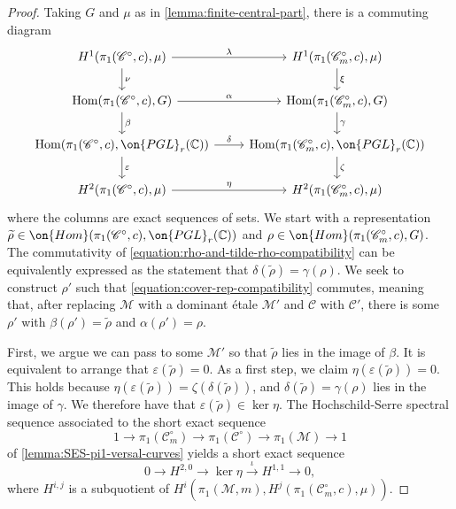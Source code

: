 \documentclass[12 pt]{amsart}
\theoremstyle{plain}
\theoremstyle{definition}
\theoremstyle{remark}
\numberwithin{equation}{section}
\DeclareMathOperator\Hom{Hom}
\begin{document}
\begin{proof}
	Taking $G$ and $\mu$ as in \autoref{lemma:finite-central-part},
	there is a commuting diagram
\begin{equation}
	\label{equation:pgl-and-birman}
	\begin{tikzcd} 
H^1(\pi_1(\mathscr C^\circ,c), \mu) \ar
		{r}{\lambda} \ar
		{d}{\nu} &  H^1(\pi_1(\mathscr
				C_m^\circ,c),
		\mu) \ar {d}{\xi} \\
		\Hom(\pi_1(\mathscr C^\circ,c), G) \ar
		{r}{\alpha} \ar
		{d}{\beta} & \Hom(\pi_1(\mathscr
				C_m^\circ,c),
			G) \ar {d}{\gamma} \\
		\Hom(\pi_1(\mathscr C^\circ,c), \on{PGL}_r(\mathbb C)) \ar
		{r}{\delta}\ar{d}{\varepsilon}
		&\Hom(\pi_1(\mathscr C_m^\circ,c),
		\on{PGL}_r(\mathbb C))\ar{d}{\zeta} \\
			H^2(\pi_1(\mathscr C^\circ,c), \mu) \ar {r}{\eta}
		& H^2(\pi_1(\mathscr C_m^\circ,c),
		\mu)
\end{tikzcd}\end{equation}
where the columns are exact sequences of sets.
We start with a representation $\widetilde{\rho} \in \on{Hom}(\pi_1(\mathscr C^\circ,c),
\on{PGL}_r(\mathbb C))$ 
and $\rho \in \on{Hom}(\pi_1(\mathscr C_m^\circ, c), G)$.
The commutativity of \eqref{equation:rho-and-tilde-rho-compatibility} can be equivalently
expressed as the statement that $\delta(\widetilde{\rho}) = \gamma(\rho)$. 
We seek to construct $\rho'$ such that \eqref{equation:cover-rep-compatibility} commutes,
meaning that, after replacing $\mathscr M$ with a dominant \'etale $\mathscr M'$ and $\mathscr{C}$ with $\mathscr{C}'$,
there is some $\rho'$ with $\beta(\rho') = \widetilde{\rho}$ and $\alpha(\rho')
= \rho$.

First, we argue we can pass to some $\mathscr M'$ so that $\widetilde{\rho}$
lies in the image of $\beta$. 
It is equivalent to arrange that $\varepsilon(\widetilde{\rho}) = 0$.
As a first step, we claim $\eta(\varepsilon(\widetilde{\rho})) = 0$.
This holds because $\eta(\varepsilon(\widetilde{\rho})) =
\zeta(\delta(\widetilde{\rho}))$, and
$\delta(\widetilde{\rho}) = \gamma(\rho)$ lies in the image of $\gamma$.
We therefore have that $\varepsilon(\widetilde{\rho}) \in \ker \eta$. 
The Hochschild-Serre spectral sequence associated to the short exact sequence  $$1\to \pi_1(\mathscr{C}_m^\circ)\to \pi_1(\mathscr{C}^\circ)\to \pi_1(\mathscr{M})\to 1$$ of
\autoref{lemma:SES-pi1-versal-curves} yields a short exact sequence $$0\to H^{2,0}\to \ker \eta \overset{\iota}{\to} H^{1,1}\to 0,$$ where $H^{i,j}$ is a subquotient of $H^i(\pi_1(\mathscr M, m), H^j(\pi_1(\mathscr C^\circ_m,c),
\mu))$.


\end{proof}
\end{document}
